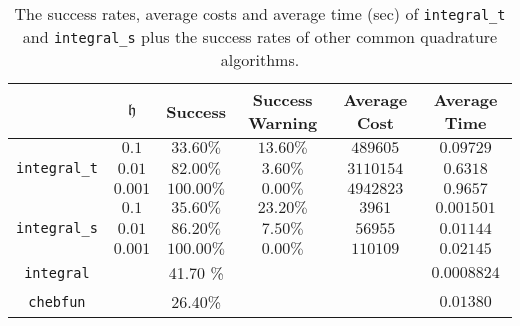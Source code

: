 \documentclass{iitthesis}
\theoremstyle{definition}
\theoremstyle{remark}
\begin{document}
\begin{table}[ht]
\caption{The success rates, average costs and average time (sec) of {\tt integral\_t} and {\tt integral\_s} plus the success rates of other common quadrature algorithms.}
\centering
\begin{tabular}{cccccc}
\hline\hline
& $\mathfrak{h}$ & Success & Success Warning & Average Cost & Average Time \\
\hline
&$0.1$  & $33.60\%$ &  $13.60\%$  & $489605$ & $0.09729$\\
{\tt integral\_t}
 &$0.01$  & $82.00\%$ & $3.60\%$ & $3110154$ & $0.6318$\\
&$0.001$ & $100.00\%$ &$0.00\%$ & $4942823$ & $0.9657$\\
\hline
&$0.1$  & $35.60\%$ &  $23.20\%$  & $3961$ & $0.001501$\\
{\tt integral\_s}
 &$0.01$  & $86.20\%$ & $7.50\%$ & $56955$ & $0.01144$\\
&$0.001$ & $100.00\%$ &$0.00\%$ & $110109$ & $0.02145$\\
\hline
{\tt integral} &  & 41.70 \% & & &$0.0008824$\\
{\tt chebfun} &  &26.40\% & & &$0.01380$\\
\hline
\end{tabular}
\label{integresultstable}
\end{table}
\end{document}
